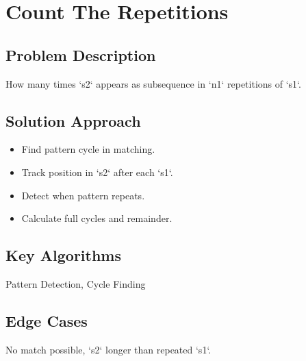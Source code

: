\documentclass[10pt, a4paper]{article}
\begin{document}
\section{Count The Repetitions}
\subsection*{Problem Description}
How many times `s2` appears as subsequence in `n1` repetitions of `s1`.

\subsection*{Solution Approach}
\begin{itemize}
    \item Find pattern cycle in matching.
    \item Track position in `s2` after each `s1`.
    \item Detect when pattern repeats.
    \item Calculate full cycles and remainder.
\end{itemize}

\subsection*{Key Algorithms}
Pattern Detection, Cycle Finding

\subsection*{Edge Cases}
No match possible, `s2` longer than repeated `s1`.
\end{document}
